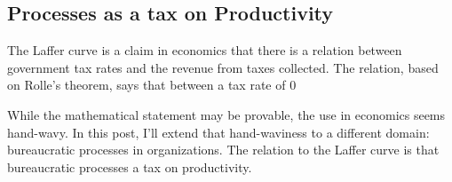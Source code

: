 
\subsection{Processes as a tax on Productivity}

The Laffer curve is a claim in economics that there is a relation between government tax rates and the revenue from taxes collected. The relation, based on Rolle's theorem, says that between a tax rate of 0%

While the mathematical statement may be provable, the use in economics seems hand-wavy. In this post, I'll extend that hand-waviness to a different domain: bureaucratic processes in organizations. The relation to the Laffer curve is that bureaucratic processes a tax on productivity. 
